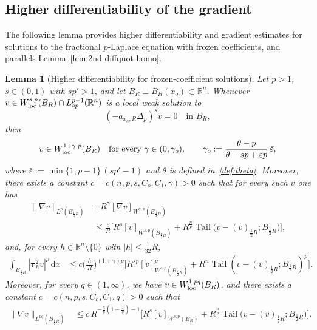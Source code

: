 \documentclass[10pt,letterpaper]{amsart}
\newtheorem{lemma}[theorem]{Lemma}
\theoremstyle{definition}
\numberwithin{theorem}{section}
\numberwithin{equation}{section}
\newcommand{\R}{\ensuremath{\mathbb{R}}}
\newcommand{\1}{\ensuremath{\mathds{1}}}
\newcommand{\dx}{\mathrm{d}x}
\renewcommand{\epsilon}{\varepsilon}
\renewcommand{\epsilon}{\varepsilon}
\DeclareMathOperator{\Tail}{Tail}
\numberwithin{equation}{section}
\begin{document}
\subsection{Higher differentiability of the gradient}
The following lemma provides higher differentiability and gradient estimates for solutions
to the fractional $p$-Laplace equation with frozen coefficients, and parallels Lemma~\ref{lem:2nd-diffquot-homo}.


\begin{lemma}[Higher differentiability for frozen-coefficient solutions]\label{lem:vi-a}
Let $p>1$, $s\in(0,1)$ with $sp'>1$, and let $B_R\equiv B_R(x_o)\subset\R^n$. Whenever $v\in W^{s,p}_{\rm loc}(B_R)\cap L^{p-1}_{sp}(\R^n)$ is a local weak solution to 
\[
(- a_{x_o,R}\Delta_p)^s v = 0 \quad \text{in } B_R,
\]
then 
\begin{equation*}
    v \in W^{1+\gamma,p}_{\rm loc}(B_R) 
    \quad \text{for every } \gamma \in (0,\gamma_o),
    \qquad 
    \gamma_o := \frac{\theta - p}{\theta - sp + \bar\epsilon p}\,\bar\epsilon,
\end{equation*}
where $\bar\epsilon := \min\{1,p-1\}\,(sp'-1)$ and $\theta$ is defined in~\eqref{def:theta}. 
Moreover, there exists a constant 
$c=c(n,p,s,C_o,C_1,\gamma)>0$ such that for every such $v$ one has
\begin{align*}
    \|\nabla v\|_{L^p(B_{\frac14R})}
    &+   R^\gamma[\nabla v]_{W^{\gamma,p}(B_{\frac14R})} \\
    &\leq
    \frac{c}{R} \Big[ R^{s}[v]_{W^{s,p}(B_{\frac12R})} +
    R^\frac{n}{p} \Tail\big(v-(v)_{\frac12R};B_{\frac12 R}\big)\Big],
\end{align*}
and, for every $h\in\R^n\setminus\{0\}$ with $|h|\le \frac1{32}R$,
\begin{align*}
    \int_{B_{\frac14 R}} |\boldsymbol{\tau}_h^2 v|^p \,\dx
    &\le 
    c \Big(\frac{|h|}{R}\Big)^{(1+\gamma)p} 
    \Big[ R^{sp} [v]_{W^{s,p}(B_{\frac12 R})}^p + R^n \Tail(v-(v)_{\frac12 R}; B_{\frac12 R})^p \Big].
\end{align*}
Moreover, for every $q\in(1,\infty)$, we have $v \in W^{1,pq}_{\rm loc}(B_R)$, and there exists a constant 
$c=c(n,p,s,C_o,C_1,q)>0$ such that
\begin{align*}
    \|\nabla v\|_{L^{pq}(B_{\frac14 R})} 
    &\le 
    c \, R^{-\frac{n}{p}\left(1-\frac{1}{q}\right)-1} 
    \Big[ R^s [v]_{W^{s,p}(B_R)} + 
    R^{\frac{n}{p}} \Tail\big(v-(v)_{\frac12 R}; B_{\frac12 R}\big) \Big].
\end{align*}
\end{lemma}
\end{document}
